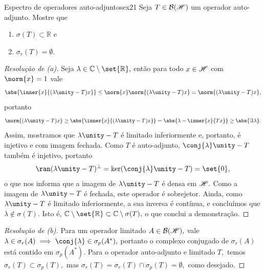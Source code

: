 \begin{exercício}{Espectro de operadores auto-adjuntos}{ex21}
    Seja \(T \in \mathcal{B}(\mathscr{H})\) um operador auto-adjunto. Mostre que
    \begin{enumerate}[label=(\alph*)]
        \item \(\sigma(T) \subset \mathbb{R}\) e
        \item \(\sigma_r(T) = \emptyset.\)
    \end{enumerate}
\end{exercício}
\begin{proof}[Resolução de (a)]
  Seja \(\lambda \in \mathbb{C} \setminus \set{\mathbb{R}},\) então para todo \(x \in \mathscr{H}\) com \(\norm{x} = 1\) vale
  \begin{equation*}
    \abs{\inner{x}{(\lambda \unity - T)x}} \leq \norm{x} \norm{(\lambda \unity - T)x} = \norm{(\lambda \unity - T)x},
  \end{equation*}
  portanto
  \begin{equation*}
    \norm{(\lambda \unity - T)x} \geq \abs{\inner{x}{(\lambda \unity - T)x}} = \abs{\lambda - \inner{x}{Tx}} \geq \abs{\Im\lambda}.
  \end{equation*}
  Assim, mostramos que \(\lambda \unity - T\) é limitado inferiormente e, portanto, é injetivo e com imagem fechada. Como \(T\) é auto-adjunto, \(\conj{\lambda} \unity - T\) também é injetivo, portanto
  \begin{equation*}
    \ran(\lambda \unity - T)^\perp = \ker(\conj{\lambda} \unity - T) = \set{0},
  \end{equation*}
  o que nos informa que a imagem de \(\lambda \unity - T\) é densa em \(\mathscr{H}.\) Como a imagem de \(\lambda \unity - T\) é fechada, este operador é sobrejetor. Ainda, como \(\lambda \unity - T\) é limitado inferiormente, a sua inversa é contínua, e concluímos que \(\lambda \notin \sigma(T).\) Isto é, \(\mathbb{C} \setminus \set{\mathbb{R}} \subset \mathbb{C} \setminus \sigma(T),\) o que conclui a demonstração.
\end{proof}
\begin{proof}[Resolução de (b)]
  Para um operador limitado \(A \in \mathcal{B}(\mathscr{H}),\) vale \(\lambda \in \sigma_r(A) \implies \conj{\lambda} \in \sigma_p(A^*),\) portanto o complexo conjugado de \(\sigma_r(A)\) está contido em \(\sigma_p(A^*).\) Para o operador auto-adjunto e limitado \(T,\) temos \(\sigma_r(T) \subset \sigma_p(T),\) mas \(\sigma_r(T) = \sigma_r(T) \cap \sigma_p(T) = \emptyset,\) como desejado.
\end{proof}
